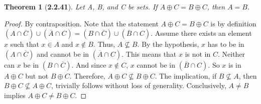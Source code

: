 \documentclass[a4paper, 12pt]{article}
\theoremstyle{plain}
\newtheorem*{theorem*}{Theorem}
\begin{document}
\pagebreak


\begin{theorem*}[\textbf{2.2.41}]
    Let A, B, and C be sets. If $A \oplus C = B \oplus C$, then $A = B$.
\end{theorem*}

\begin{proof} 
By contraposition. Note that the statement $A \oplus C = B \oplus C$ is by 
definition $(A \cap \overline{C}) \cup (\overline{A} \cap C) = 
(B \cap \overline{C}) \cup (\overline{B} \cap C)$. Assume there exists an element $x$ 
such that $x \in A$ and $x \notin B$. Thus, $A \not\subseteq B$. By the hypothesis, $x$ 
has to be in $(A \cap \overline{C})$ and cannot be in $(\overline{A} \cap C)$. This means 
that $x$ is not in $C$. Neither can $x$ be in $(B \cap \overline{C})$. And since 
$x \notin C$, $x$ cannot be in $(\overline{B} \cap C)$. So $x$ is in  $A \oplus C$ but not 
$B \oplus C$. Therefore, $A \oplus C \not\subseteq B \oplus C$. The implication, if 
$B \not\subseteq A$, then $B \oplus C \not\subseteq A \oplus C$, trivially follows without 
loss of generality. Conclusively, $A \neq B$ implies $A \oplus C \neq B \oplus C$.
\end{proof}
\end{document}
